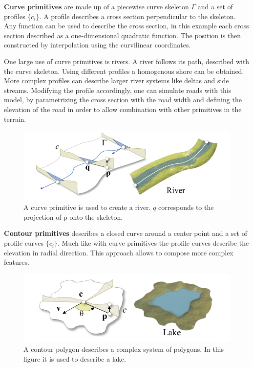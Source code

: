 \textbf{Curve primitives} are made up of a piecewise curve skeleton  $\Gamma$ and a set of profiles $\{c_i\}$. A profile describes a cross section perpendicular to the skeleton. Any function can be used to describe the cross section, in this example each cross section described as a one-dimensional quadratic function. The position is then constructed by interpolation using the curvilinear coordinates. 

One large use of curve primitives is rivers. A river follows its path, described with the curve skeleton. Using different profiles a homogenous shore can be obtained. More complex profiles can describe larger river systems like deltas and side streams. 
Modifying the profile accordingly, one can simulate roads with this model, by parametrizing the cross section with the road width and defining the elevation of the road in order to allow combination with other primitives in the terrain.

\begin{figure}[htb]
	\centering
	\includegraphics[width=.8\linewidth]{GGP15/curve_primitive}
	\caption{A curve primitive is used to create a river. $q$ corresponds to the projection of p onto the skeleton.}
	\label{fig:curve_primitive}
\end{figure}

\textbf{Contour primitives} describes a closed curve around a center point and a set of profile curves $\{ c_i \}$. Much like with curve primitives the profile curves describe the elevation in radial direction. This approach allows to compose more complex features.

\begin{figure}[htb]
	\centering
	\includegraphics[width=.8\linewidth]{GGP15/contour_primitive}
	\caption{A contour polygon describes a complex system of polygons. In this figure it is used to describe a lake.}
	\label{fig:contour_primitive}
\end{figure}

